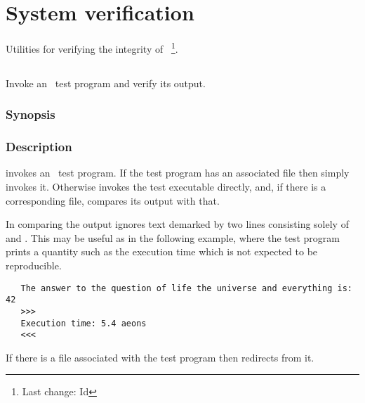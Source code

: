 \chapter{System verification}
\label{System verification}

Utilities for verifying the integrity of \aipspp\ \footnote{Last change:
$ $Id$ $}.


\section{}
\label{assay}
 
Invoke an \aipspp\ test program and verify its output.

\subsection*{Synopsis}
 
\begin{synopsis}
\end{synopsis}
 
\subsection*{Description}
 
 invokes an \aipspp\ test program.  If the test program has an
associated  file then  simply invokes it.  Otherwise
 invokes the test executable directly, and, if there is a
corresponding  file, compares its output with that.

In comparing the output  ignores text demarked by two lines
consisting solely of \code{>>>} and \code{<<<}.  This may be useful as in the
following example, where the test program prints a quantity such as the
execution time which is not expected to be reproducible.

\begin{verbatim}
   The answer to the question of life the universe and everything is: 42
   >>>
   Execution time: 5.4 aeons
   <<<
\end{verbatim}

If there is a  file associated with the test program then
 redirects  from it.

